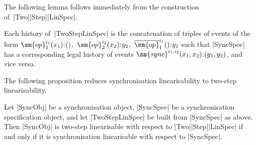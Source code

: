 
The following lemma follows immediately from the construction
of~|Two|\-|Step|\-|LinSpec|. 
%
\begin{lemma}
\label{lem:TwoStepLinSpec-histories}
Each history of~|TwoStepLinSpec| is the concatenation of triples of events of
the form $\sm{op}_1^{i_1}(x_1) \:: ()$,\, $\sm{op}_2^{i_2}(x_2) \:: y_2$,\,
$\overline{\sm{op}}_1^{i_1}() \:: y_1$ such that |SyncSpec| has a
corresponding legal history of events $\sm{sync}^{i_1,i_2}(x_1,x_2) \::
(y_1,y_2)$, and vice versa.
\end{lemma}


The following proposition reduces synchronisation linearisability to two-step
linearisability.
%
\begin{prop}
Let |SyncObj| be a synchronisation object, |SyncSpec| be a synchronisation
specification object, and let |TwoStepLinSpec| be built from |SyncSpec| as
above.  Then |SyncObj| is two-step linearisable with respect to
|Two|\-|Step|\-|LinSpec| if and only if it is synchronisation linearisable
with respect to |SyncSpec|.
\end{prop}
